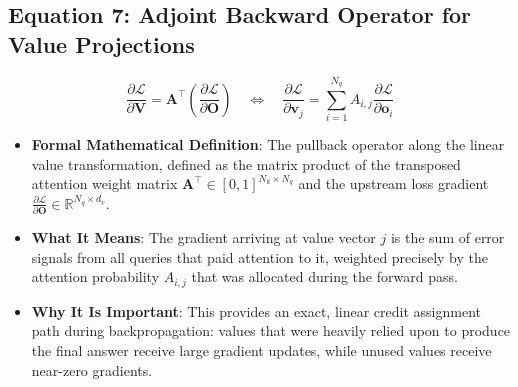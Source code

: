 \documentclass[11pt,a4paper]{article}
\theoremstyle{definition}
\begin{document}
\subsection{\textbf{Equation 7: Adjoint Backward Operator for Value Projections}}
{\boldmath
\begin{equation}
\frac{\partial \mathcal{L}}{\partial \mathbf{V}} = \mathbf{A}^\top \left(\frac{\partial \mathcal{L}}{\partial \mathbf{O}}\right) \quad \Longleftrightarrow \quad \frac{\partial \mathcal{L}}{\partial \mathbf{v}_j} = \sum_{i=1}^{N_q} A_{i, j} \frac{\partial \mathcal{L}}{\partial \mathbf{o}_i}
\end{equation}
}
\begin{itemize}
    \item \textbf{Formal Mathematical Definition}:
    The pullback operator along the linear value transformation, defined as the matrix product of the transposed attention weight matrix $\mathbf{A}^\top \in [0, 1]^{N_k \times N_q}$ and the upstream loss gradient $\frac{\partial \mathcal{L}}{\partial \mathbf{O}} \in \mathbb{R}^{N_q \times d_v}$.
    \item \textbf{What It Means}:
    The gradient arriving at value vector $j$ is the sum of error signals from all queries that paid attention to it, weighted precisely by the attention probability $A_{i, j}$ that was allocated during the forward pass.
    \item \textbf{Why It Is Important}:
    This provides an exact, linear credit assignment path during backpropagation: values that were heavily relied upon to produce the final answer receive large gradient updates, while unused values receive near-zero gradients.
\end{itemize}
\end{document}
